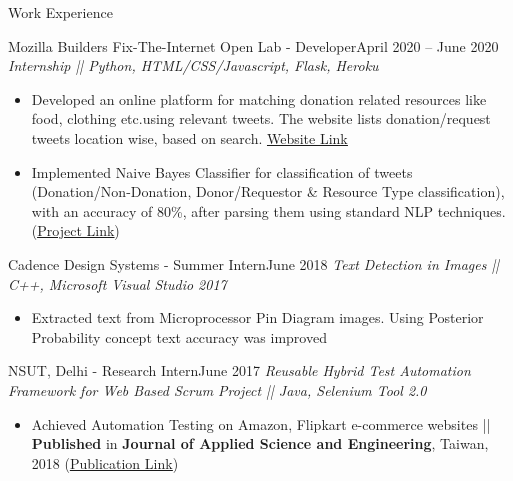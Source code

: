 \documentclass[]{mcdowellcv}
\begin{document}
	\begin{cvsection}{Work Experience}
		\begin{cvsubsection}{Mozilla Builders Fix-The-Internet Open Lab - Developer}{}{April 2020 -- June 2020}
			\textit{Internship || Python, HTML/CSS/Javascript, Flask, Heroku}
			\begin{itemize}
			    \item Developed an online platform for matching donation related resources like food, clothing etc.using relevant tweets. The website lists donation/request tweets location wise, based on search. \underline{\href{https://help-for-all.herokuapp.com/}{Website Link}}
			    \item Implemented Naive Bayes Classifier for classification of tweets (Donation/Non-Donation, Donor/Requestor \& Resource Type classification), with an accuracy of 80\%, after parsing them using standard NLP techniques. (\href{https://github.com/shanujshekhar/MozillaOpenLab}{\underline{Project Link}})
			\end{itemize}
		\end{cvsubsection}
		
		\begin{cvsubsection}{Cadence Design Systems - Summer Intern}{}{June 2018}	    \textit{Text Detection in Images || C++, Microsoft Visual Studio 2017}
			\begin{itemize}
				\item Extracted text from Microprocessor Pin Diagram images. Using Posterior Probability concept text accuracy was improved
			\end{itemize}
		\end{cvsubsection}
		
		\begin{cvsubsection}{NSUT, Delhi - Research Intern}{}{June 2017}		
		    \textit{Reusable Hybrid Test Automation Framework for Web Based Scrum Project || Java, Selenium Tool 2.0}
			\begin{itemize}
				\item Achieved Automation Testing on Amazon, Flipkart e-commerce websites || \textbf{Published} in \textbf{Journal of Applied Science and Engineering}, Taiwan, 2018 (\href{http://www2.tku.edu.tw/~tkjse/21-3/catology.htm}{\underline{Publication Link}})
			\end{itemize}
		\end{cvsubsection}
	\end{cvsection}
	
\end{document}
